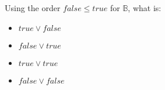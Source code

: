 Using the order $false \leq true$ for $\mathbb{B}$, what is: \begin{itemize}
    \item $true \lor false$
    \item $false \lor true$
    \item $true \lor true$
    \item $false \lor false$
  \end{itemize}